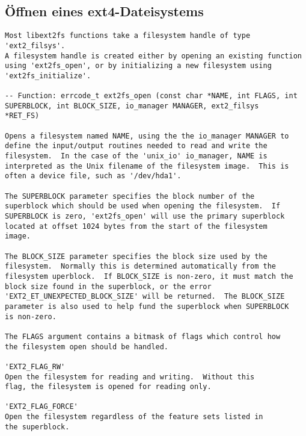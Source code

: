 \documentclass[11pt,a4paper]{article}
\begin{document}
\subsection{Öffnen eines ext4-Dateisystems}
\begin{verbatim}
Most libext2fs functions take a filesystem handle of type 'ext2_filsys'.
A filesystem handle is created either by opening an existing function
using 'ext2fs_open', or by initializing a new filesystem using
'ext2fs_initialize'.

-- Function: errcode_t ext2fs_open (const char *NAME, int FLAGS, int
SUPERBLOCK, int BLOCK_SIZE, io_manager MANAGER, ext2_filsys
*RET_FS)

Opens a filesystem named NAME, using the the io_manager MANAGER to
define the input/output routines needed to read and write the
filesystem.  In the case of the 'unix_io' io_manager, NAME is
interpreted as the Unix filename of the filesystem image.  This is
often a device file, such as '/dev/hda1'.

The SUPERBLOCK parameter specifies the block number of the
superblock which should be used when opening the filesystem.  If
SUPERBLOCK is zero, 'ext2fs_open' will use the primary superblock
located at offset 1024 bytes from the start of the filesystem
image.

The BLOCK_SIZE parameter specifies the block size used by the
filesystem.  Normally this is determined automatically from the
filesystem uperblock.  If BLOCK_SIZE is non-zero, it must match the
block size found in the superblock, or the error
'EXT2_ET_UNEXPECTED_BLOCK_SIZE' will be returned.  The BLOCK_SIZE
parameter is also used to help fund the superblock when SUPERBLOCK
is non-zero.

The FLAGS argument contains a bitmask of flags which control how
the filesystem open should be handled.

'EXT2_FLAG_RW'
Open the filesystem for reading and writing.  Without this 
flag, the filesystem is opened for reading only.

'EXT2_FLAG_FORCE'
Open the filesystem regardless of the feature sets listed in
the superblock.
\end{verbatim}
\end{document}
